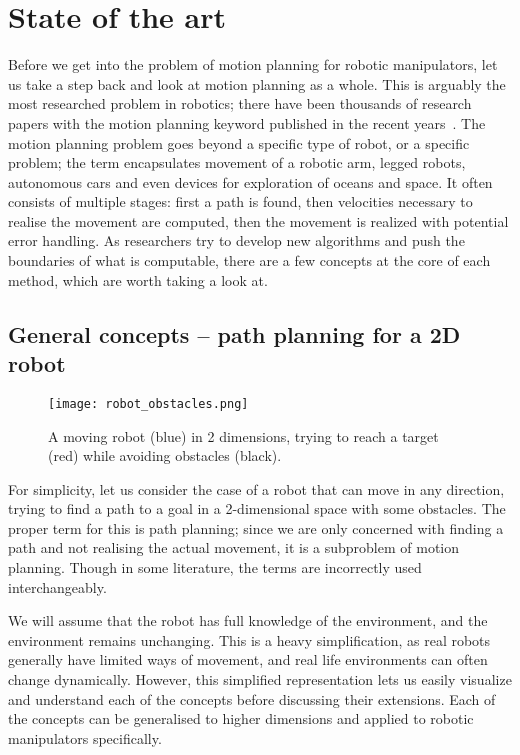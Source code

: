 \chapter{State of the art}\label{SotA}

Before we get into the problem of motion planning for robotic manipulators, let us take a step back and look at motion planning as a whole. This is arguably the most researched problem in robotics; there have been thousands of research papers with the motion planning keyword published in the recent years~\cite{RASreview}. The motion planning problem goes beyond a specific type of robot, or a specific problem; the term encapsulates movement of a robotic arm, legged robots, autonomous cars and even devices for exploration of oceans and space. It often consists of multiple stages: first a path is found, then velocities necessary to realise the movement are computed, then the movement is realized with potential error handling.
As researchers try to develop new algorithms and push the boundaries of what is computable, there are a few concepts at the core of each method, which are worth taking a look at.

\section{General concepts -- path planning for a 2D robot}

\begin{wrapfigure}{r}{0.33\textwidth}
    \centering
    \texttt{[image: robot\_obstacles.png]}
  \caption{A moving robot (blue) in 2 dimensions, trying to reach a target (red) while avoiding obstacles (black).}\label{fig:bot}
\end{wrapfigure}

For simplicity, let us consider the case of a robot that can move in any direction, trying to find a path to a goal in a 2-dimensional space with some obstacles. The proper term for this is path planning; since we are only concerned with finding a path and not realising the actual movement, it is a subproblem of motion planning. Though in some literature, the terms are incorrectly used interchangeably.

We will assume that the robot has full knowledge of the environment, and the environment remains unchanging. This is a heavy simplification, as real robots generally have limited ways of movement, and real life environments can often change dynamically. However, this simplified representation lets us easily visualize and understand each of the concepts before discussing their extensions. Each of the concepts can be generalised to higher dimensions and applied to robotic manipulators specifically.

